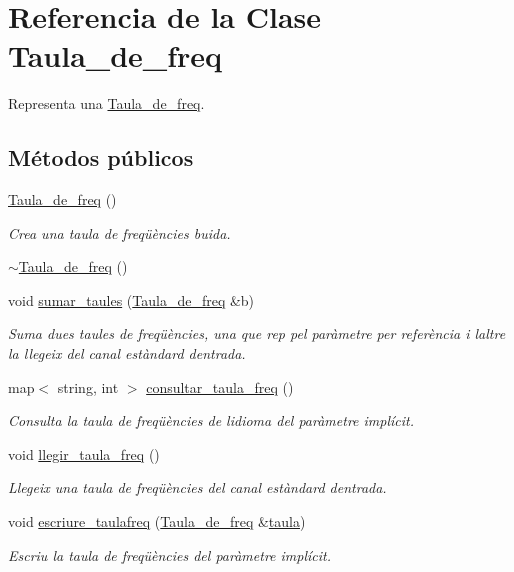 \hypertarget{class_taula__de__freq}{}\section{Referencia de la Clase Taula\+\_\+de\+\_\+freq}
\label{class_taula__de__freq}


Representa una \hyperlink{class_taula__de__freq}{Taula\+\_\+de\+\_\+freq}.  


\subsection*{Métodos públicos}
\begin{DoxyCompactItemize}
\item 
\hyperlink{class_taula__de__freq_a57b8d780af285f09746da0a96dfd9d61}{Taula\+\_\+de\+\_\+freq} ()
\begin{DoxyCompactList}\small\item\em Crea una taula de freqüències buida. \end{DoxyCompactList}\item 
\hyperlink{class_taula__de__freq_a046a70a0ea38d03da605998cf99d5335}{$\sim$\+Taula\+\_\+de\+\_\+freq} ()
\item 
void \hyperlink{class_taula__de__freq_a59add68c3c129a8908907b038d6344f8}{sumar\+\_\+taules} (\hyperlink{class_taula__de__freq}{Taula\+\_\+de\+\_\+freq} \&b)
\begin{DoxyCompactList}\small\item\em Suma dues taules de freqüències, una que rep pel paràmetre per referència i l\textquotesingle{}altre la llegeix del canal estàndard d\textquotesingle{}entrada. \end{DoxyCompactList}\item 
map$<$ string, int $>$ \hyperlink{class_taula__de__freq_a438f3ce025ca433420891fead5affae4}{consultar\+\_\+taula\+\_\+freq} ()
\begin{DoxyCompactList}\small\item\em Consulta la taula de freqüències de l\textquotesingle{}idioma del paràmetre implícit. \end{DoxyCompactList}\item 
void \hyperlink{class_taula__de__freq_a6e3d7bfaa7227f9b7603864c7a3da2cf}{llegir\+\_\+taula\+\_\+freq} ()
\begin{DoxyCompactList}\small\item\em Llegeix una taula de freqüències del canal estàndard d\textquotesingle{}entrada. \end{DoxyCompactList}\item 
void \hyperlink{class_taula__de__freq_a60e643811c232a7ca679c2bf43dcb79c}{escriure\+\_\+taulafreq} (\hyperlink{class_taula__de__freq}{Taula\+\_\+de\+\_\+freq} \&\hyperlink{class_taula__de__freq_a2c7db75db1ccbbe347de775844f3bbd7}{taula})
\begin{DoxyCompactList}\small\item\em Escriu la taula de freqüències del paràmetre implícit. \end{DoxyCompactList}\end{DoxyCompactItemize}

